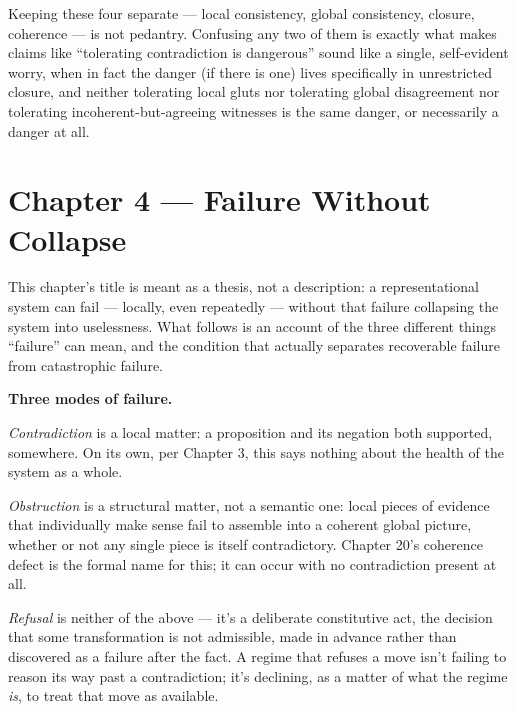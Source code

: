 Keeping these four separate --- local consistency, global consistency,
closure, coherence --- is not pedantry. Confusing any two of them is
exactly what makes claims like ``tolerating contradiction is dangerous''
sound like a single, self-evident worry, when in fact the danger (if
there is one) lives specifically in unrestricted closure, and neither
tolerating local gluts nor tolerating global disagreement nor tolerating
incoherent-but-agreeing witnesses is the same danger, or necessarily a
danger at all.

\hypertarget{chapter-4-failure-without-collapse}{%
\chapter*{Chapter 4 --- Failure Without Collapse}
\label{chapter-4-failure-without-collapse}}

This chapter's title is meant as a thesis, not a description: a
representational system can fail --- locally, even repeatedly --- without
that failure collapsing the system into uselessness. What follows is an
account of the three different things ``failure'' can mean, and the
condition that actually separates recoverable failure from catastrophic
failure.

\textbf{Three modes of failure.}

\emph{Contradiction} is a local matter: a proposition and its negation both
supported, somewhere. On its own, per Chapter 3, this says nothing about
the health of the system as a whole.

\emph{Obstruction} is a structural matter, not a semantic one: local pieces of
evidence that individually make sense fail to assemble into a coherent
global picture, whether or not any single piece is itself contradictory.
Chapter 20's coherence defect is the formal name for this; it can occur
with no contradiction present at all.

\emph{Refusal} is neither of the above --- it's a deliberate constitutive act,
the decision that some transformation is not admissible, made in advance
rather than discovered as a failure after the fact. A regime that refuses
a move isn't failing to reason its way past a contradiction; it's
declining, as a matter of what the regime \emph{is}, to treat that move as
available.

